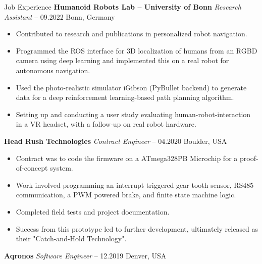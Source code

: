\begin{rubric}{Job Experience}
%
%
\entry*[] \textbf{Humanoid Robots Lab -- University of Bonn} \hfill \textit{Research Assistant}  -- 09.2022 \hfill Bonn, Germany \newline 
\vspace{\CVItemizeHeaderSpacing} \begin{itemize} %
	\setlength{\itemsep}{\CVItemizeSpacing}
	\item Contributed to research and publications in personalized robot navigation.
	\item Programmed the ROS interface for 3D localization of humans from an RGBD camera using deep learning and implemented this on a real robot for autonomous navigation.
	\item Used the photo-realistic simulator iGibson (PyBullet backend) to generate data for a deep reinforcement learning-based path planning algorithm. 
	\item Setting up and conducting a user study evaluating human-robot-interaction in a VR headset, with a follow-up on real robot hardware.
\end{itemize}
%
%
\entry*[] \textbf{Head Rush Technologies} \hfill \textit{Contract Engineer}  -- 04.2020 \hfill Boulder, USA \newline 
\vspace{\CVItemizeHeaderSpacing} \begin{itemize} %
	\setlength{\itemsep}{\CVItemizeSpacing}
	\item Contract was to code the firmware on a ATmega328PB Microchip for a proof-of-concept system.  
	\item Work involved programming an interrupt triggered gear tooth sensor, RS485 communication, a PWM powered brake, and finite state machine logic.  
	\item Completed field tests and project documentation.  
	\item Success from this prototype led to further development, ultimately released as their "Catch-and-Hold Technology".
\end{itemize}
%
%
\entry*[] \textbf{Aqronos} \hfill \textit{Software Engineer}  -- 12.2019 \hfill Denver, USA \newline
\vspace{\CVItemizeHeaderSpacing} \begin{itemize} %

\end{itemize}
\end{rubric}
